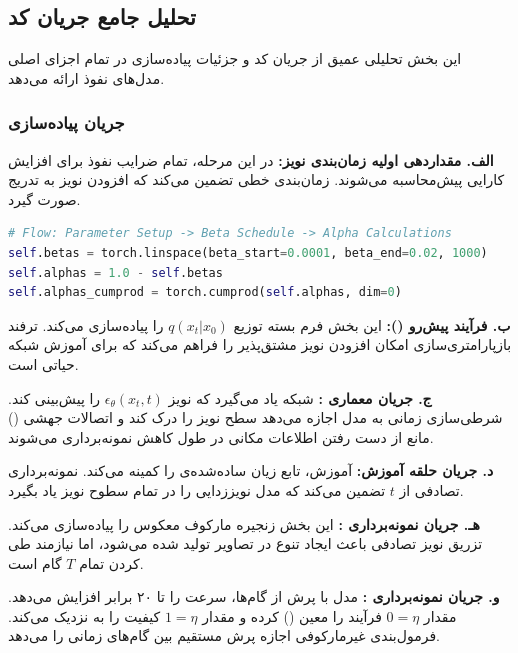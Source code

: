 \subsection{تحلیل جامع جریان کد}
این بخش تحلیلی عمیق از جریان کد و جزئیات پیاده‌سازی در تمام اجزای اصلی مدل‌های نفوذ ارائه می‌دهد.

\subsubsection{جریان پیاده‌سازی }

\textbf{الف. مقداردهی اولیه زمان‌بندی نویز:}
در این مرحله، تمام ضرایب نفوذ برای افزایش کارایی پیش‌محاسبه می‌شوند. زمان‌بندی خطی  تضمین می‌کند که افزودن نویز به تدریج صورت گیرد.

\begin{latin}
\begin{lstlisting}[language=Python]
# Flow: Parameter Setup -> Beta Schedule -> Alpha Calculations
self.betas = torch.linspace(beta_start=0.0001, beta_end=0.02, 1000)
self.alphas = 1.0 - self.betas
self.alphas_cumprod = torch.cumprod(self.alphas, dim=0)
\end{lstlisting}
\end{latin}



\textbf{ب. فرآیند پیش‌رو ():}
این بخش فرم بسته توزیع $q(x_t|x_0)$ را پیاده‌سازی می‌کند. ترفند بازپارامتری‌سازی امکان افزودن نویز مشتق‌پذیر را فراهم می‌کند که برای آموزش شبکه حیاتی است.

\textbf{ج. جریان معماری :}
شبکه  یاد می‌گیرد که نویز $\epsilon_\theta(x_t, t)$ را پیش‌بینی کند. شرطی‌سازی زمانی به مدل اجازه می‌دهد سطح نویز را درک کند و اتصالات جهشی () مانع از دست رفتن اطلاعات مکانی در طول کاهش نمونه‌برداری می‌شوند.



\textbf{د. جریان حلقه آموزش:}
آموزش، تابع زیان ساده‌شده‌ی  را کمینه می‌کند. نمونه‌برداری تصادفی از $t$ تضمین می‌کند که مدل نویززدایی را در تمام سطوح نویز یاد بگیرد.

\textbf{هـ. جریان نمونه‌برداری :}
این بخش زنجیره مارکوف معکوس را پیاده‌سازی می‌کند. تزریق نویز تصادفی باعث ایجاد تنوع در تصاویر تولید شده می‌شود، اما نیازمند طی کردن تمام $T$ گام است.



\textbf{و. جریان نمونه‌برداری :}
مدل  با پرش از گام‌ها، سرعت را تا ۲۰ برابر افزایش می‌دهد. مقدار $0=\eta$ فرآیند را معین () کرده و مقدار $1=\eta$ کیفیت را به  نزدیک می‌کند. فرمول‌بندی غیرمارکوفی اجازه پرش مستقیم بین گام‌های زمانی را می‌دهد.

